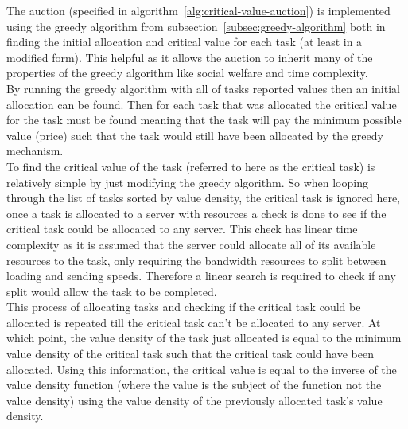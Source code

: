 The auction (specified in algorithm~\ref{alg:critical-value-auction}) is implemented using the greedy algorithm from
subsection~\ref{subsec:greedy-algorithm} both in finding the initial allocation and critical value for each task (at
least in a modified form). This helpful as it allows the auction to inherit many of the properties of the greedy
algorithm like social welfare and time complexity. \\
By running the greedy algorithm with all of tasks reported values then an initial allocation can be found. Then for
each task that was allocated the critical value for the task must be found meaning that the task will pay the minimum
possible value (price) such that the task would still have been allocated by the greedy mechanism. \\
To find the critical value of the task (referred to here as the critical task) is relatively simple by just modifying
the greedy algorithm. So when looping through the list of tasks sorted by value density, the critical task is ignored
here, once a task is allocated to a server with resources a check is done to see if the critical task could be
allocated to any server. This check has linear time complexity as it is assumed that the server could allocate all of
its available resources to the task, only requiring the bandwidth resources to split between loading and sending speeds.
Therefore a linear search is required to check if any split would allow the task to be completed. \\
This process of allocating tasks and checking if the critical task could be allocated is repeated till the critical
task can't be allocated to any server. At which point, the value density of the task just allocated is equal to the
minimum value density of the critical task such that the critical task could have been allocated. Using this
information, the critical value is equal to the inverse of the value density function (where the value is the subject
of the function not the value density) using the value density of the previously allocated task's value density.

